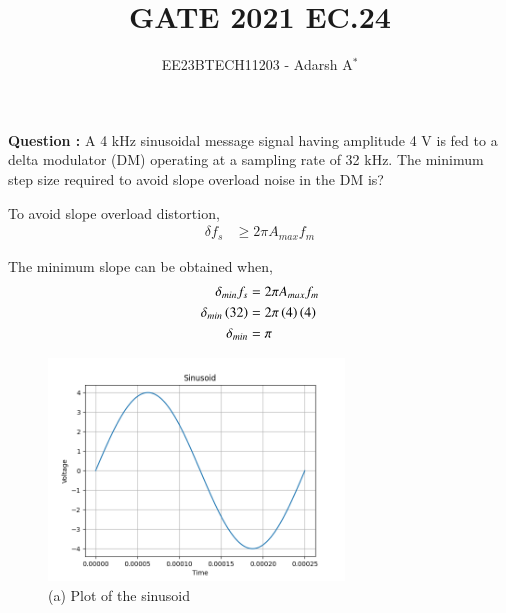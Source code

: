 \documentclass[journal,12pt,onecolumn]{IEEEtran}
\theoremstyle{remark}
\begin{document}
	
	
	\vspace{3cm}
	
	\title{GATE 2021 EC.24}
	\author{EE23BTECH11203 - Adarsh A$^{*}$%
	}
	\maketitle
	\bigskip
	
	\renewcommand{\thefigure}{\theenumi}
	\renewcommand{\thetable}{\theenumi}
	
	
	\vspace{0.2cm}
	\linespread{1.1}
	
	\textbf{Question : }
	A 4 kHz sinusoidal message signal having amplitude 4 V is fed to a delta modulator (DM) operating at a sampling rate of 32 kHz. The minimum step size required to avoid slope overload noise in the DM is?
	
	\vspace{0.3cm}
	\solution
 	\fi
	
	
	
	To avoid slope overload distortion,
	\begin{align}
		\delta f_s &\geq 2\pi A_{max} f_m
	\end{align}
	
	The minimum slope can be obtained when,
	\begin{align}
		\delta_{min} f_s &= 2\pi A_{max} f_m\\
		\delta_{min} \left(32\right) &= 2\pi \left(4\right) \left(4\right)\\
		\delta_{min} &= \pi
	\end{align}
	
	\begin{figure}[htbp]
		\centering
		\includegraphics[width=0.7\textwidth]{2021/EC/24/figs/Figure_2.png}
		\caption*{(a) Plot of the sinusoid}
	\end{figure}
	
\end{document}
